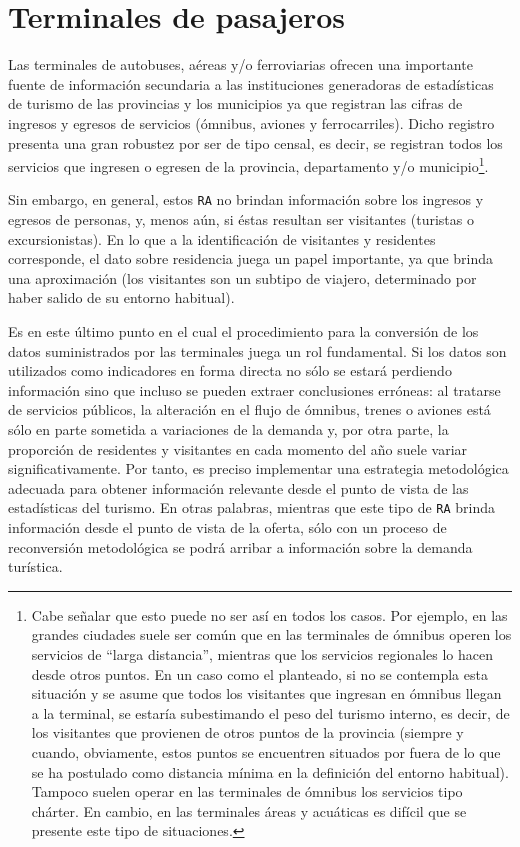 \documentclass[
]{book}
\begin{document}
\hypertarget{terminales-de-pasajeros}{%
\section{Terminales de pasajeros}\label{terminales-de-pasajeros}}

\hfill\break
Las terminales de autobuses, aéreas y/o ferroviarias ofrecen una importante fuente de información secundaria a las instituciones generadoras de estadísticas de turismo de las provincias y los municipios ya que registran las cifras de ingresos y egresos de servicios (ómnibus, aviones y ferrocarriles). Dicho registro presenta una gran robustez por ser de tipo censal, es decir, se registran todos los servicios que ingresen o egresen de la provincia, departamento y/o municipio\footnote{Cabe señalar que esto puede no ser así en todos los casos. Por ejemplo, en las grandes ciudades suele ser común que en las terminales de ómnibus operen los servicios de ``larga distancia'', mientras que los servicios regionales lo hacen desde otros puntos. En un caso como el planteado, si no se contempla esta situación y se asume que todos los visitantes que ingresan en ómnibus llegan a la terminal, se estaría subestimando el peso del turismo interno, es decir, de los visitantes que provienen de otros puntos de la provincia (siempre y cuando, obviamente, estos puntos se encuentren situados por fuera de lo que se ha postulado como distancia mínima en la definición del entorno habitual). Tampoco suelen operar en las terminales de ómnibus los servicios tipo chárter. En cambio, en las terminales áreas y acuáticas es difícil que se presente este tipo de situaciones.}.

Sin embargo, en general, estos \texttt{RA} no brindan información sobre los ingresos y egresos de personas, y, menos aún, si éstas resultan ser visitantes (turistas o excursionistas). En lo que a la identificación de visitantes y residentes corresponde, el dato sobre residencia juega un papel importante, ya que brinda una aproximación (los visitantes son un subtipo de viajero, determinado por haber salido de su entorno habitual).

Es en este último punto en el cual el procedimiento para la conversión de los datos suministrados por las terminales juega un rol fundamental. Si los datos son utilizados como indicadores en forma directa no sólo se estará perdiendo información sino que incluso se pueden extraer conclusiones erróneas: al tratarse de servicios públicos, la alteración en el flujo de ómnibus, trenes o aviones está sólo en parte sometida a variaciones de la demanda y, por otra parte, la proporción de residentes y visitantes en cada momento del año suele variar significativamente. Por tanto, es preciso implementar una estrategia metodológica adecuada para obtener información relevante desde el punto de vista de las estadísticas del turismo. En otras palabras, mientras que este tipo de \texttt{RA} brinda información desde el punto de vista de la oferta, sólo con un proceso de reconversión metodológica se podrá arribar a información sobre la demanda turística.
\end{document}

